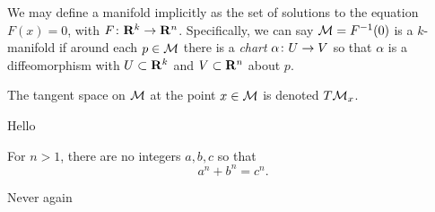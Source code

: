 \documentclass{article}
\begin{document}
\lecture{}

We may define a manifold implicitly as the set of solutions to the equation $F(x) = 0$,
with $F \from \RR[k] \to \RR[n]$.
Specifically, we can say $\sM = F\inv(0)$ is a $k$-manifold if around each $p \in \sM$
there is a \emph{chart} $\alpha \from U \to V$ so that $\alpha$ is a diffeomorphism with $U \subset \RR[k]$ and $V \subset \RR[n]$ about $p$.

\begin{definition}
  The tangent space on $\sM$ at the point $x \in \sM$ is denoted $T\sM_{x}$.
\end{definition}

\begin{remark}
  Hello
\end{remark}

\begin{theorem}[]
  For $n > 1$, there are no integers $a, b, c$ so that
  \[ a^{n} + b^{n} = c^{n}. \]
\end{theorem}

\begin{corollary}[]
  Never again
\end{corollary}
\end{document}
